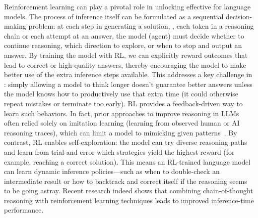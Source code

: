 Reinforcement learning can play a pivotal role in unlocking effective \TTS for language models. The process of inference itself can be formulated as a sequential decision-making problem: at each step in generating a solution, \eg, each token in a reasoning chain or each attempt at an answer, the model (agent) must decide whether to continue reasoning, which direction to explore, or when to stop and output an answer. By training the model with RL, we can explicitly reward outcomes that lead to correct or high-quality answers, thereby encouraging the model to make better use of the extra inference steps available. This addresses a key challenge in \TTS: simply allowing a model to think longer doesn’t guarantee better answers unless the model knows how to productively use that extra time (it could otherwise repeat mistakes or terminate too early). RL provides a feedback-driven way to learn such behaviors. In fact, prior approaches to improve reasoning in LLMs often relied solely on imitation learning (learning from observed human or AI reasoning traces), which can limit a model to mimicking given patterns~\citep{hou2025advancing}. By contrast, RL enables self-exploration: the model can try diverse reasoning paths and learn from trial-and-error which strategies yield the highest reward (for example, reaching a correct solution). This means an RL-trained language model can learn dynamic inference policies—such as when to double-check an intermediate result or how to backtrack and correct itself if the reasoning seems to be going astray. Recent research indeed shows that combining chain-of-thought reasoning with reinforcement learning techniques leads to improved inference-time performance. 



